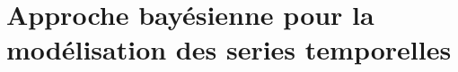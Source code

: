 \documentclass{presentation_template}
\begin{document}
%

\section{Approche bayésienne pour la modélisation des series temporelles}
\end{document}
